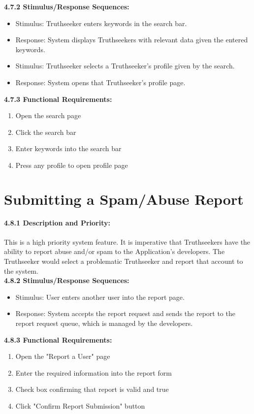     \quad \textbf{4.7.2 \quad Stimulus/Response Sequences:}
    \begin{itemize}
    \item[] Stimulus: \thinspace \quad Truthseeker enters keywords in the search bar.
    \item[] Response: \quad System displays Truthseekers with relevant data given the entered keywords.
    \item[] Stimulus: \quad Truthseeker selects a Truthseeker's profile given by the search.
    \item[] Response: \quad System opens that Truthseeker's profile page.
    \end{itemize}
    
    \quad \textbf{4.7.3 \quad Functional Requirements:}
    \begin{enumerate}
        \item Open the search page
        \item Click the search bar
        \item Enter keywords into the search bar
        \item Press any profile to open profile page
    \end{enumerate}


\section{Submitting a Spam/Abuse Report}
    \quad \textbf{4.8.1 \quad Description and Priority:}\\ \\
    \null \quad This is a high priority system feature. It is imperative that Truthseekers have the ability to report abuse and/or spam to the Application's developers. The Truthseeker would select a problematic Truthseeker and report that account to the system. \\
    
    \quad \textbf{4.8.2 \quad Stimulus/Response Sequences:}
    \begin{itemize}
    \item[] Stimulus: \thinspace \quad User enters another user into the report page.
    \item[] Response: \quad System accepts the report request and sends the report to the report request queue, which is managed by the developers.
    \end{itemize}
    
    \quad \textbf{4.8.3 \quad Functional Requirements:}
    \begin{enumerate}
        \item Open the "Report a User" page
        \item Enter the required information into the report form
        \item Check box confirming that report is valid and true
        \item Click "Confirm Report Submission" button
    \end{enumerate}

